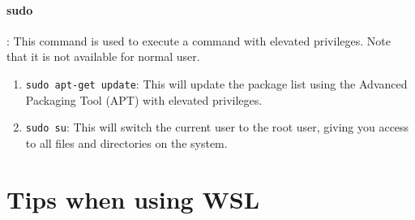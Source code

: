\documentclass[10pt, a4paper]{article}
\begin{document}
\paragraph{sudo}: This command is used to execute a command with elevated privileges. Note that it is not available for normal user.
\begin{enumerate}
    \item \texttt{sudo apt-get update}: This will update the package list using the Advanced Packaging Tool (APT) with elevated privileges.
    \item \texttt{sudo su}: This will switch the current user to the root user, giving you access to all files and directories on the system.
\end{enumerate}

\section*{Tips when using WSL}
\end{document}
